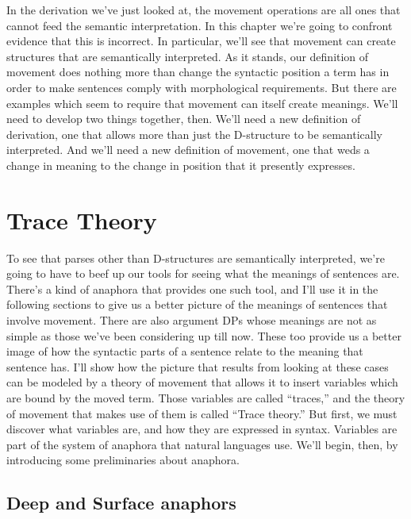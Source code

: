 In the derivation we've just looked at, the movement operations are all ones that cannot feed the semantic interpretation. In this chapter we're going to confront evidence that this is incorrect. In particular, we'll see that movement can create structures that are semantically interpreted. As it stands, our definition of movement does nothing more than change the syntactic position a term has in order to make sentences comply with morphological requirements. But there are examples which seem to require that movement can itself create meanings. We'll need to develop two things together, then. We'll need a new definition of derivation, one that allows more than just the D-structure to be semantically interpreted. And we'll need a new definition of movement, one that weds a change in meaning to the change in position that it presently expresses.

\section{Trace Theory}
\label{sec:tracetheory}

To see that parses other than D-structures are semantically interpreted, we're going to have to beef up our tools for seeing what the meanings of sentences are. There's a kind of anaphora that provides one such tool, and I'll use it in the following sections to give us a better picture of the meanings of sentences that involve movement. There are also argument DPs whose meanings are not as simple as those we've been considering up till now. These too provide us a better image of how the syntactic parts of a sentence relate to the meaning that sentence has. I'll show how the picture that results from looking at these cases can be modeled by a theory of movement that allows it to insert variables which are bound by the moved term. Those variables are called ``traces,'' and the theory of movement that makes use of them is called ``Trace theory.'' But first, we must discover what variables are, and how they are expressed in syntax. Variables are part of the system of anaphora that natural languages use. We'll begin, then, by introducing some preliminaries about anaphora.

\subsection{Deep and Surface anaphors}
\label{sec:deepsurfaceanapors}


